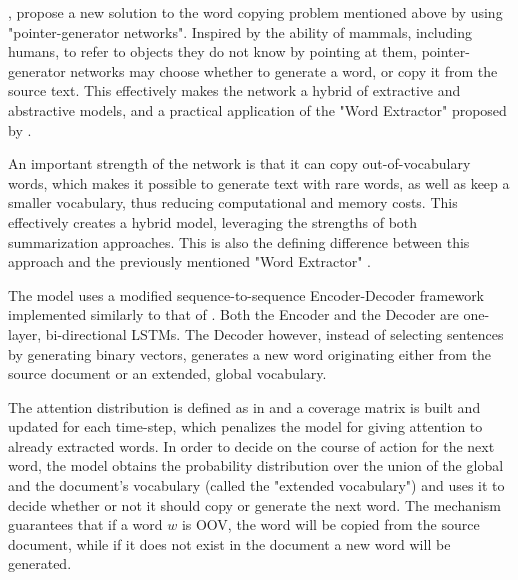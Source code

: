 \documentclass[preprint,review,12pt]{elsarticle}
\begin{document}

\citet{abigail}, propose a new solution to the word copying problem mentioned above by using "pointer-generator networks". Inspired by the ability of mammals, including humans, to refer to objects they do not know by pointing at them, pointer-generator networks may choose whether to generate a word, or copy it from the source text. This effectively makes the network a hybrid of extractive and abstractive models, and a practical application of the "Word Extractor" proposed by \citet{lapata}. 

An important strength of the network is that it can copy out-of-vocabulary words, which makes it possible to generate text with rare words, as well as keep a smaller vocabulary, thus reducing computational and memory costs. This effectively creates a hybrid model, leveraging the strengths of both summarization approaches. This is also the defining difference between this approach and the previously mentioned "Word Extractor" \cite{lapata}. 

The model uses a modified sequence-to-sequence Encoder-Decoder framework implemented similarly to that of \citet{nallapati}. Both the Encoder and the Decoder are one-layer, bi-directional LSTMs. The Decoder however, instead of selecting sentences by generating binary vectors, generates a new word originating either from the source document or an extended, global vocabulary. 

The attention distribution is defined as in \citet{bahdanau} and a coverage matrix is built and updated for each time-step, which penalizes the model for giving attention to  already extracted words. In order to decide on the course of action for the next word, the model obtains the probability distribution over the union of the global and the document's vocabulary (called the "extended vocabulary") and uses it to decide whether or not it should copy or generate the next word. The mechanism guarantees that if a word $w$ is OOV, the word will be copied from the source document, while if it does not exist in the document a new word will be generated.
\end{document}
